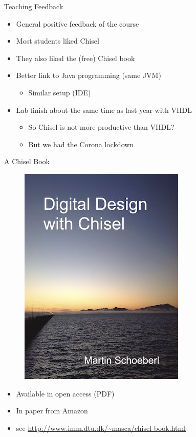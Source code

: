 \begin{frame}[fragile]{Teaching Feedback}
\begin{itemize}
\item General positive feedback of the course
\item Most students liked Chisel
\item They also liked the (free) Chisel book
\item Better link to Java programming (same JVM)
\begin{itemize}
\item Similar setup (IDE)
\end{itemize}
\item Lab finish about the same time as last year with VHDL
\begin{itemize}
\item So Chisel is not more productive than VHDL?
\item But we had the Corona lockdown
\end{itemize}
\end{itemize}
\end{frame}

\begin{frame}[fragile]{A Chisel Book}
\begin{figure}
    \centering
    \includegraphics[scale=0.4]{../cover-small}
\end{figure}

\begin{itemize}
\item Available in open access (PDF)
\item In paper from Amazon
\item see \url{http://www.imm.dtu.dk/~masca/chisel-book.html}
\end{itemize}
\end{frame}

